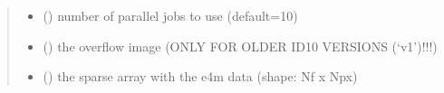 \documentclass[letterpaper,10pt,english]{sphinxmanual}
\begin{document}
\begin{fulllineitems}
\begin{quote}
\begin{description}
\begin{itemize}
\item {} 
\sphinxAtStartPar
{} () \textendash{} number of parallel jobs to use (default=10)

\end{itemize}

\sphinxAtStartPar
\begin{itemize}
\item {} 
\sphinxAtStartPar
{} () \textendash{} the overflow image (ONLY FOR OLDER ID10 VERSIONS (‘v1’)!!!)

\item {} 
\sphinxAtStartPar
{} () \textendash{} the sparse array with the e4m data (shape: Nf x Npx)

\end{itemize}


\end{description}\end{quote}

\end{fulllineitems}

\end{document}

